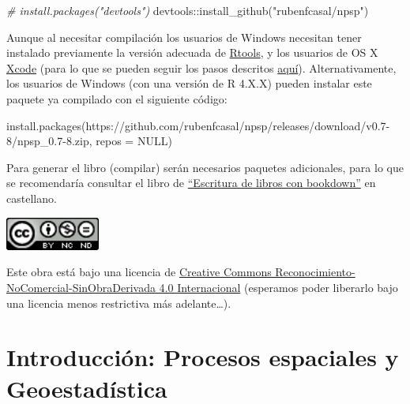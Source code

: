 \documentclass[
  spanish,
]{book}
\newenvironment{Shaded}{\begin{snugshade}}{\end{snugshade}}
\newcommand{\AttributeTok}[1]{\textcolor[rgb]{0.77,0.63,0.00}{#1}}
\newcommand{\CommentTok}[1]{\textcolor[rgb]{0.56,0.35,0.01}{\textit{#1}}}
\newcommand{\ConstantTok}[1]{\textcolor[rgb]{0.00,0.00,0.00}{#1}}
\newcommand{\FunctionTok}[1]{\textcolor[rgb]{0.00,0.00,0.00}{#1}}
\newcommand{\NormalTok}[1]{#1}
\newcommand{\SpecialCharTok}[1]{\textcolor[rgb]{0.00,0.00,0.00}{#1}}
\newcommand{\StringTok}[1]{\textcolor[rgb]{0.31,0.60,0.02}{#1}}
\theoremstyle{break}
\begin{document}
\begin{Shaded}
\begin{Highlighting}[]
\CommentTok{\# install.packages("devtools")}
\NormalTok{devtools}\SpecialCharTok{::}\FunctionTok{install\_github}\NormalTok{(}\StringTok{"rubenfcasal/npsp"}\NormalTok{)}
\end{Highlighting}
\end{Shaded}

Aunque al necesitar compilación los usuarios de Windows necesitan tener instalado previamente la versión adecuada de \href{https://cran.r-project.org/bin/windows/Rtools/}{Rtools}, y los usuarios de OS X \href{https://apps.apple.com/us/app/xcode/id497799835}{Xcode}
(para lo que se pueden seguir los pasos descritos \href{https://rubenfcasal.github.io/post/instalacion-de-r}{aquí}).
Alternativamente, los usuarios de Windows (con una versión de R 4.X.X) pueden instalar este paquete ya compilado con el siguiente código:

\begin{Shaded}
\begin{Highlighting}[]
\FunctionTok{install.packages}\NormalTok{(}\StringTok{\textquotesingle{}https://github.com/rubenfcasal/npsp/releases/download/v0.7{-}8/npsp\_0.7{-}8.zip\textquotesingle{}}\NormalTok{, }
                 \AttributeTok{repos =} \ConstantTok{NULL}\NormalTok{)}
\end{Highlighting}
\end{Shaded}

Para generar el libro (compilar) serán necesarios paquetes adicionales,
para lo que se recomendaría consultar el libro de \href{https://rubenfcasal.github.io/bookdown_intro}{``Escritura de libros con bookdown''} en castellano.

\includegraphics[width=1.22in]{images/by-nc-nd-88x31}

Este obra está bajo una licencia de \href{https://creativecommons.org/licenses/by-nc-nd/4.0/deed.es_ES}{Creative Commons Reconocimiento-NoComercial-SinObraDerivada 4.0 Internacional}
(esperamos poder liberarlo bajo una licencia menos restrictiva más adelante\ldots).

\hypertarget{intro-estesp}{%
\chapter{Introducción: Procesos espaciales y Geoestadística}\label{intro-estesp}}
\end{document}

